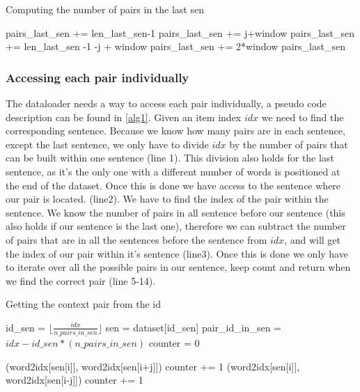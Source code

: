 \begin{algorithm}[h]
\caption{Computing the number of pairs in the last sen}
\label{alg2}
\begin{algorithmic}[1]
\STATE pairs\_last\_sen += len\_last\_sen-1
\ELSE
\STATE pairs\_last\_sen += j+window
\ENDIF
{}
\STATE pairs\_last\_sen += len\_last\_sen -1 -j + window
\ELSE
\STATE pairs\_last\_sen += 2*window
\ENDIF
\ENDFOR
\RETURN pairs\_last\_sen
\end{algorithmic}
\end{algorithm}

\subsubsection{Accessing each pair individually}
The dataloader needs a way to access each pair individually, a pseudo code description can be found in \ref{alg1}.
Given an item index $idx$ we need to find the corresponding sentence. Because we know how many pairs are in each sentence, except the last sentence, we only have to divide $idx$ by the number of pairs that can be built within one sentence (line 1). This division also holds for the last sentence, as it's the only one with a different number of words is positioned at the end of the dataset. Once this is done we have access to the sentence where our pair is located. (line2). We have to find the index of the pair within the sentence. We know the number of pairs in all sentence before our sentence (this also holds if our sentence is the last one), therefore we can subtract the number of pairs that are in all the sentences before the sentence from $idx$, and will get the index of our pair within it's sentence (line3). Once this is done we only have to iterate over all the possible pairs in our sentence, keep count and return when we find the correct pair (line 5-14).
\begin{algorithm}
\caption{Getting the context pair from the id}
\label{alg1}
\begin{algorithmic}[1]

\STATE id\_sen = $\lfloor \frac{idx}{n\_pairs\_in\_sen} \rfloor$
\STATE sen = dataset[id\_sen]
\STATE pair\_id\_in\_sen = $idx - id\_sen*(n\_pairs\_in\_sen)$
\STATE counter = 0

\RETURN (word2idx[sen[i]], word2idx[sen[i+j]])
\ENDIF
\STATE counter += 1
\ENDIF
{}
\RETURN (word2idx[sen[i]], word2idx[sen[i-j]])
\ENDIF
\STATE counter += 1
\ENDIF
\ENDFOR
\ENDFOR
\end{algorithmic}
\end{algorithm}

